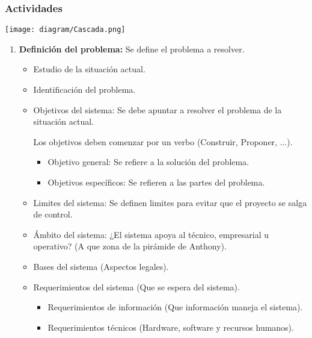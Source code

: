 \documentclass{templateNote}
\begin{document}
\subsubsection*{Actividades}
\begin{center}
    \texttt{[image: diagram/Cascada.png]}
\end{center}

\begin{enumerate}
    \item \textbf{Definición del problema:} Se define el problema a resolver.
    \begin{itemize}
        \item Estudio de la situación actual.
        
        \item Identificación del problema.
        
        \item Objetivos del sistema: Se debe apuntar a resolver el problema de la situaci\'on actual.
        
        Los objetivos deben comenzar por un verbo (Construir, Proponer, ...).
        \begin{itemize}
            \item Objetivo general: Se refiere a la soluci\'on del problema.
            
            \item Objetivos espec\'ificos: Se refieren a las partes del problema.
        \end{itemize}
        
        \item Limites del sistema: Se definen limites para evitar que el proyecto se salga de control.
        
        \item Ámbito del sistema: ¿El sistema apoya al t\'ecnico, empresarial u operativo? (A que zona de la pirámide de Anthony).
        
        \item Bases del sistema (Aspectos legales).
        
        \item Requerimientos del sistema (Que se espera del sistema).
        \begin{itemize}
            \item Requerimientos de información (Que información maneja el sistema).
            
            \item Requerimientos técnicos (Hardware, software y recursos humanos).
            

\end{itemize}
\end{itemize}
\end{enumerate}
\end{document}
